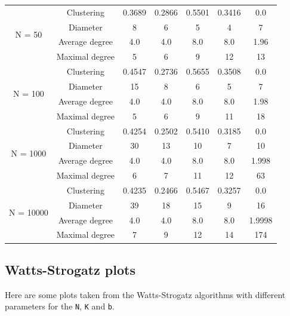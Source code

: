 \documentclass[a4paper]{article}
\theoremstyle{definition}
\begin{document}
{\begin{tabular}{c c | c | c | c | c | c |}
    \multicolumn{1}{|c|}{\multirow{4}{*}{N = 50}} & Clustering & 0.3689 & 0.2866
    & 0.5501 & 0.3416 & 0.0\\ \cline{2-7}
    \multicolumn{1}{|c|}{} & Diameter & 8 & 6 & 5 & 4 & 7 \\ \cline{2-7}
    \multicolumn{1}{|c|}{} & Average degree & 4.0 & 4.0 & 8.0 & 8.0 & 1.96\\ \cline{2-7}
    \multicolumn{1}{|c|}{} & Maximal degree & 5 & 6 & 9 & 12 & 13\\ \cline{2-7}
    \hline

    \multicolumn{1}{|c|}{\multirow{4}{*}{N = 100}} & Clustering & 0.4547 & 0.2736 
    & 0.5655 & 0.3508 & 0.0\\ \cline{2-7}
    \multicolumn{1}{|c|}{} & Diameter & 15 & 8 & 6 & 5 & 7\\ \cline{2-7}
    \multicolumn{1}{|c|}{} & Average degree & 4.0 & 4.0 & 8.0 & 8.0 & 1.98\\ \cline{2-7}
    \multicolumn{1}{|c|}{} & Maximal degree & 5 & 6 & 9 & 11 & 18\\ \cline{2-7}
    \hline

    \multicolumn{1}{|c|}{\multirow{4}{*}{N = 1000}} & Clustering & 0.4254 & 0.2502
    & 0.5410 & 0.3185 & 0.0\\ \cline{2-7}
    \multicolumn{1}{|c|}{} & Diameter & 30 & 13 & 10 & 7 & 10 \\ \cline{2-7}
    \multicolumn{1}{|c|}{} & Average degree & 4.0 & 4.0 & 8.0 & 8.0 & 1.998\\
    \cline{2-7}
    \multicolumn{1}{|c|}{} & Maximal degree & 6 & 7 & 11 & 12 & 63\\ \cline{2-7}
    \hline

    \multicolumn{1}{|c|}{\multirow{4}{*}{N = 10000}} & Clustering & 0.4235 & 0.2466
    & 0.5467 & 0.3257 & 0.0\\ \cline{2-7}
    \multicolumn{1}{|c|}{} & Diameter & 39 & 18 & 15 & 9 & 16 \\ \cline{2-7}
    \multicolumn{1}{|c|}{} & Average degree & 4.0 & 4.0 & 8.0 & 8.0 & 1.9998\\
    \cline{2-7}
    \multicolumn{1}{|c|}{} & Maximal degree & 7 & 9 & 12 & 14 & 174\\ \cline{2-7}
    \hline

  \end{tabular}
}

\subsection{Watts-Strogatz plots}
Here are some plots taken from the Watts-Strogatz algorithms with different
parameters for the \texttt{N}, \texttt{K} and \texttt{b}.\\
\end{document}

